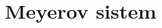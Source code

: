 \documentclass[main.tex]{subfiles}
\begin{document}
\section{Meyerov sistem}\label{sec:meyer}
\end{document}
